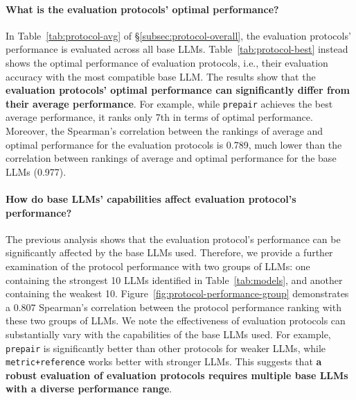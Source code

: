\documentclass[11pt]{article}
\begin{document}
\paragraph{What is the evaluation protocols' optimal performance?}
In Table~\ref{tab:protocol-avg} of \S\ref{subsec:protocol-overall}, the evaluation protocols' performance is evaluated across all base LLMs.
Table~\ref{tab:protocol-best} instead shows the optimal performance of evaluation protocols, i.e., their evaluation accuracy with the most compatible base LLM.
The results show that the \textbf{evaluation protocols' optimal performance can significantly differ from their average performance}.
For example, while \texttt{prepair} achieves the best average performance, it ranks only 7th in terms of optimal performance.
Moreover, the Spearman's correlation between the rankings of average and optimal performance for the evaluation protocols is 0.789, much lower than the correlation between rankings of average and optimal performance for the base LLMs (0.977).



\paragraph{How do base LLMs' capabilities affect evaluation protocol's performance?}

The previous analysis shows that the evaluation protocol's performance can be significantly affected by the base LLMs used.
Therefore, we provide a further examination of the protocol performance with two groups of LLMs: one containing the strongest 10 LLMs identified in Table~\ref{tab:models}, and another containing the weakest 10.
Figure~\ref{fig:protocol-performance-group} demonstrates a 0.807 Spearman's correlation between the protocol performance ranking with these two groups of LLMs.
We note the effectiveness of evaluation protocols can substantially vary with the capabilities of the base LLMs used.
For example, \texttt{prepair} is significantly better than other protocols for weaker LLMs, while \texttt{metric+reference} works better with stronger LLMs.
This suggests that \textbf{a robust evaluation of evaluation protocols requires multiple base LLMs with a diverse performance range}.
\end{document}
